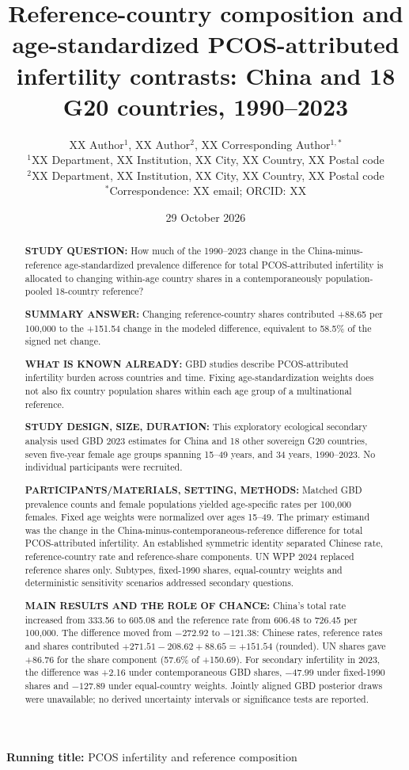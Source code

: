 \documentclass[11pt,a4paper]{article}
\title{Reference-country composition and age-standardized PCOS-attributed infertility contrasts: China and 18 G20 countries, 1990--2023}
\author{XX Author$^{1}$, XX Author$^{2}$, XX Corresponding Author$^{1,*}$\\
{\small $^{1}$XX Department, XX Institution, XX City, XX Country, XX Postal code}\\
{\small $^{2}$XX Department, XX Institution, XX City, XX Country, XX Postal code}\\
{\small $^{*}$Correspondence: XX email; ORCID: XX}}
\date{29 October 2026}
\begin{document}
\maketitle\thispagestyle{fancy}
\noindent\textbf{Running title:} PCOS infertility and reference composition

\linenumbers
\begingroup\sloppy
\begin{abstract}
\noindent\textbf{STUDY QUESTION:} How much of the 1990--2023 change in the China-minus-reference age-standardized prevalence difference for total PCOS-attributed infertility is allocated to changing within-age country shares in a contemporaneously population-pooled 18-country reference?

\noindent\textbf{SUMMARY ANSWER:} Changing reference-country shares contributed +88.65 per 100,000 to the +151.54 change in the modeled difference, equivalent to 58.5\% of the signed net change.

\noindent\textbf{WHAT IS KNOWN ALREADY:} GBD studies describe PCOS-attributed infertility burden across countries and time. Fixing age-standardization weights does not also fix country population shares within each age group of a multinational reference.

\noindent\textbf{STUDY DESIGN, SIZE, DURATION:} This exploratory ecological secondary analysis used GBD 2023 estimates for China and 18 other sovereign G20 countries, seven five-year female age groups spanning 15--49 years, and 34 years, 1990--2023. No individual participants were recruited.

\noindent\textbf{PARTICIPANTS/MATERIALS, SETTING, METHODS:} Matched GBD prevalence counts and female populations yielded age-specific rates per 100,000 females. Fixed age weights were normalized over ages 15--49. The primary estimand was the change in the China-minus-contemporaneous-reference difference for total PCOS-attributed infertility. An established symmetric identity separated Chinese rate, reference-country rate and reference-share components. UN WPP 2024 replaced reference shares only. Subtypes, fixed-1990 shares, equal-country weights and deterministic sensitivity scenarios addressed secondary questions.

\noindent\textbf{MAIN RESULTS AND THE ROLE OF CHANCE:} China's total rate increased from 333.56 to 605.08 and the reference rate from 606.48 to 726.45 per 100,000. The difference moved from $-272.92$ to $-121.38$: Chinese rates, reference rates and shares contributed $+271.51-208.62+88.65=+151.54$ (rounded). UN shares gave +86.76 for the share component (57.6\% of +150.69). For secondary infertility in 2023, the difference was +2.16 under contemporaneous GBD shares, $-47.99$ under fixed-1990 shares and $-127.89$ under equal-country weights. Jointly aligned GBD posterior draws were unavailable; no derived uncertainty intervals or significance tests are reported.


\end{abstract}
\end{document}
